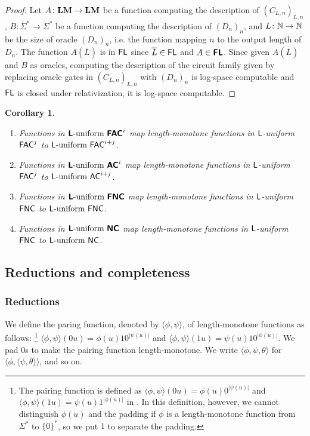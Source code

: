 \documentclass{article}
\newtheorem{corollary}[theorem]{Corollary}
\theoremstyle{definition}
\theoremstyle{remark}
\begin{document}
\begin{proof}
 Let $A \colon \mathbf{LM} \to \mathbf{LM}$ be a function computing the description of $(C_{L,n})_{L,n}$,
 $B \colon \Sigma^* \to \Sigma^*$ be a function computing the description of $(D_n)_n$, and
 $L \colon \mathbb N \to \mathbb N$ be the size of oracle $(D_n)_n$, i.e.
 the function mapping $n$ to the output length of $D_n$.
 The function $A(\overline{L})$ is in $\mathsf{FL}$ since $\overline{L} \in \mathsf{FL}$ and $A \in \text{\bfseries \sffamily \upshape FL}$.
 Since given $A(\overline{L})$ and $B$ as oracles,
 computing the description of the circuit family given by replacing oracle
 gates in $(C_{L,n})_{L,n}$ with $(D_n)_n$ is log-space computable
 and $\mathsf{FL}$ is closed under relativization,
 it is log-space computable.
\end{proof}

\begin{corollary}
\mbox{}
\begin{enumerate}
 \item Functions in $\Luniform\ \classFACtwo^i$ 
       map length-monotone functions in $\mathsf{L}$-uniform $\mathsf{FAC}^j$ 
       to $\mathsf{L}\text{-uniform }\mathsf{FAC}^{i+j}$.
 \item Functions in $\Luniform\ \classACtwo^i$ 
       map length-monotone functions in $\mathsf{L}$-uniform $\mathsf{FAC}^j$ 
       to $\mathsf{L}\text{-uniform }\mathsf{AC}^{i+j}$.
 \item Functions in $\Luniform\ \classFNCtwo$
       map length-monotone functions in $\mathsf{L}$-uniform $\mathsf{FNC}$ 
       to $\mathsf{L}\text{-uniform }\mathsf{FNC}$.
 \item Functions in $\Luniform\ \classNCtwo$
       map length-monotone functions in $\mathsf{L}$-uniform $\mathsf{FNC}$ 
       to $\mathsf{L}\text{-uniform }\mathsf{NC}$.
\end{enumerate}
\end{corollary}




\subsection{Reductions and completeness}

\subsubsection{Reductions}
We define the paring function, denoted by $\langle \phi, \psi \rangle$,
of length-monotone functions as follows:%
\footnote{
The pairing function is defined as
$\langle \phi, \psi \rangle(0u) = \phi(u) 0^{|\psi(u)|}$
and 
$\langle \phi, \psi \rangle(1u) = \psi(u) 1^{|\phi(u)|}$ 
in \cite{kawamura2010complexity}.
In this definition, however, we cannot distinguish $\phi(u)$ and the padding
if $\phi$ is a length-monotone function from $\Sigma^*$ to $\{0\}^*$,
so we put $1$ to separate the padding.
}
$\langle \phi, \psi \rangle(0u) = \phi(u) 10^{|\psi(u)|}$ and 
$\langle \phi, \psi \rangle(1u) = \psi(u) 10^{|\phi(u)|}$.
We pad $0$s to make the pairing function length-monotone.
We write $\langle \phi, \psi, \theta \rangle$ 
for $\langle \phi, \langle \psi, \theta \rangle \rangle$, and so on.
\end{document}
